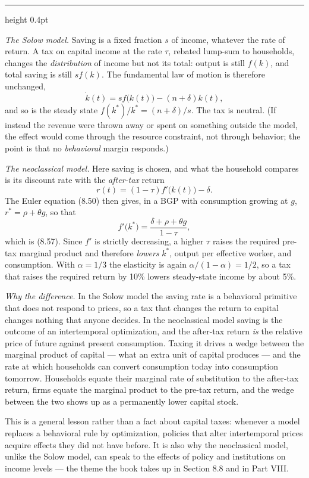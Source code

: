 \documentclass[11pt,letterpaper,reqno]{amsart}
\makeatletter
\newcommand{\dt}[1]{\dot{#1}}
\newcommand{\as@head}[3]{%
  \par\addvspace{1.6ex}\penalty-200\relax
  \phantomsection
  \addcontentsline{toc}{subsection}{#1 #2\texorpdfstring{\ifx\relax#3\relax\else\quad #3\fi}{}}%
  {\color{RuleGrey}\hrule height 0.4pt}%
  \nobreak\vspace{0.8ex}\nobreak
  \noindent{\bfseries #1 #2}%
  \ifx\relax#3\relax\else\quad{\bfseries\itshape #3}\fi
  \par\nobreak\vspace{0.4ex}\nobreak
  \as@beginstatement
}
\newcommand{\as@beginstatement}{\begingroup\itshape\ignorespaces}
\newenvironment{aex}[2]{\as@head{Exercise}{#1}{#2}}{\par\addvspace{1.2ex}}
\newcommand{\bk}[1]{\textup{\textsc{#1}}}
\renewcommand{\as@beginstatement}{\ignorespaces}
\makeatother
\begin{document}
\begin{aex}{8.39}{}
\emph{The Solow model.}  Saving is a fixed fraction $s$ of income, whatever the rate of return.  A tax on
capital income at the rate $\tau$, rebated lump-sum to households, changes the \emph{distribution} of income
but not its total: output is still $f(k)$, and total saving is still $sf(k)$.  The fundamental law of motion
is therefore unchanged,
\[
\dt k(t)=sf\bigl(k(t)\bigr)-(n+\delta)k(t),
\]
and so is the steady state $f(k^{*})/k^{*}=(n+\delta)/s$.  The tax is neutral.  (If instead the revenue were
thrown away or spent on something outside the model, the effect would come through the resource constraint,
not through behavior; the point is that no \emph{behavioral} margin responds.)

\emph{The neoclassical model.}  Here saving is chosen, and what the household compares is its discount rate
with the \emph{after-tax} return
\[
r(t)=(1-\tau)f'\bigl(k(t)\bigr)-\delta .
\]
The Euler equation \bk{(8.50)} then gives, in a BGP with consumption growing at $g$,
$r^{*}=\rho+\theta g$, so that
\[
f'\bigl(k^{*}\bigr)=\frac{\delta+\rho+\theta g}{1-\tau} ,
\]
which is \bk{(8.57)}.  Since $f'$ is strictly decreasing, a higher $\tau$ raises the required pre-tax
marginal product and therefore \emph{lowers} $k^{*}$, output per effective worker, and consumption.  With
$\alpha=1/3$ the elasticity is again $\alpha/(1-\alpha)=1/2$, so a tax that raises the required return by
10\% lowers steady-state income by about 5\%.

\emph{Why the difference.}  In the Solow model the saving rate is a behavioral primitive that does not
respond to prices, so a tax that changes the return to capital changes nothing that anyone decides.  In the
neoclassical model saving is the outcome of an intertemporal optimization, and the after-tax return
\emph{is} the relative price of future against present consumption.  Taxing it drives a wedge between the
marginal product of capital --- what an extra unit of capital produces --- and the rate at which households
can convert consumption today into consumption tomorrow.  Households equate their marginal rate of
substitution to the after-tax return, firms equate the marginal product to the pre-tax return, and the wedge
between the two shows up as a permanently lower capital stock.

This is a general lesson rather than a fact about capital taxes: whenever a model replaces a behavioral
rule by optimization, policies that alter intertemporal prices acquire effects they did not have before.
It is also why the neoclassical model, unlike the Solow model, can speak to the effects of policy and
institutions on income levels --- the theme the book takes up in Section 8.8 and in Part VIII.
\end{aex}
\end{document}
